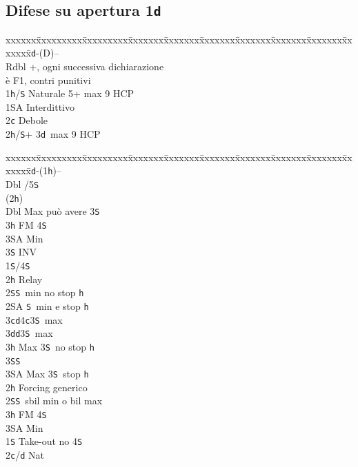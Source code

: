 \documentclass[a4paper,italian]{article}
\newcommand{\BS}{\small{\texttt{S}}}
\newcommand{\BC}{\small{\texttt{c}}}
\newcommand{\BD}{\small{\texttt{d}}}
\newcommand{\BH}{\small{\texttt{h}}}
\newcommand{\pdfd}{\texorpdfstring{\texttt{d}}{D}}
\newenvironment{bidtable}
{\begin{tabbing}

    xxxxxx\=xxxxxxxxx\=xxxxxxxxx\=xxxxxxx\=xxxxxxx\=xxxxxxx\=xxxxxxx\=xxxxxxx\=xxxxxxx\=xxxxxxx\=\kill}
{\end{tabbing} }%
\begin{document}
\newpage
\begin{multicols*}{2}

    \subsection{Difese su apertura 1\pdfd}

    \begin{bidtable}
        1\BD-(D)--\+\\
        Rdbl +, ogni successiva dichiarazione\+\\ è F1, contri punitivi\-\\
        1\BH/\BS \> Naturale 5+ max 9 HCP\\
        1\small{SA} \> Interdittivo\\
        2\BC \> Debole\\
        2\BH/\BS {}+ 3\BD\ max 9 HCP\-
    \end{bidtable}
    \begin{bidtable}
        1\BD-(1\BH)--\+\\
        Dbl /5\BS \+\\
        (2\BH)\+\\
        Dbl \> Max può avere 3\BS \\
        3\BH \> FM 4\BS \+\\
        3\small{SA} \> Min\-\\
        3\BS \> INV\-\\
        1\BS {}/4\BS \+\\
        2\BH \> Relay\+\\
        2\BS {}\BS\ min no stop \BH \\
        2\small{SA} \BS\ min e stop \BH \\
        3\BC {}\BD 4\BC 3\BS\ max\\
        3\BD {}\BD 3\BS\ max\\
        3\BH \> Max 3\BS\ no stop \BH \\
        3\BS {}\BS \\
        3\small{SA} \> Max 3\BS\ stop \BH \-\-\\
        2\BH \> Forcing generico\\
        2\BS {}\BS\ sbil min o bil max\\
        3\BH \> FM 4\BS \+\\
        3\small{SA} \> Min\-\-\\
        1\BS \> Take-out no 4\BS \\
        2\BC/\BD \> Nat\+\\

\end{bidtable}
\end{multicols*}
\end{document}
